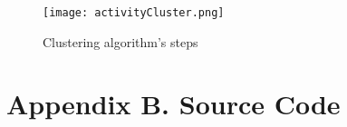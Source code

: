 \begin{figure}[!hb]
\renewcommand\thefigure{B.6}
\centering
\texttt{[image: activityCluster.png]}
\caption{Clustering algorithm's steps}\label{activity2}
\end{figure}



\clearpage

\section*{Appendix B. Source Code}
	

	

	

	

	

	

	







